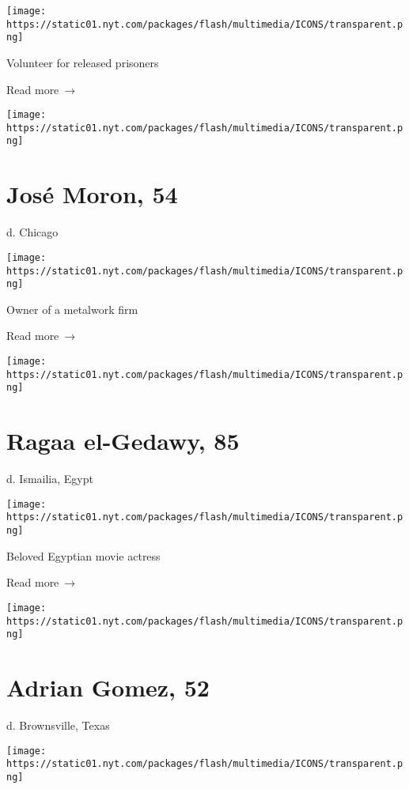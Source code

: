 \texttt{[image: https://static01.nyt.com/packages/flash/multimedia/ICONS/transparent.png]}

Volunteer for released prisoners

 Read more~→

\href{https://www.nytimes.com/2020/07/13/obituaries/jose-moron-dead-coronavirus.html}{}

\texttt{[image: https://static01.nyt.com/packages/flash/multimedia/ICONS/transparent.png]}

\hypertarget{josuxe9-moron-54}{%
\section{José Moron, 54}\label{josuxe9-moron-54}}

d. Chicago

\texttt{[image: https://static01.nyt.com/packages/flash/multimedia/ICONS/transparent.png]}

Owner of a metalwork firm

 Read more~→

\href{https://www.nytimes.com/2020/07/11/obituaries/ragaa-el-gedawy-dead-coronavirus.html}{}

\texttt{[image: https://static01.nyt.com/packages/flash/multimedia/ICONS/transparent.png]}

\hypertarget{ragaa-el-gedawy-85}{%
\section{Ragaa el-Gedawy, 85}\label{ragaa-el-gedawy-85}}

d. Ismailia, Egypt

\texttt{[image: https://static01.nyt.com/packages/flash/multimedia/ICONS/transparent.png]}

Beloved Egyptian movie actress

 Read more~→

\href{https://www.nytimes.com/2020/07/10/obituaries/adrian-gomez-dead-coronavirus.html}{}

\texttt{[image: https://static01.nyt.com/packages/flash/multimedia/ICONS/transparent.png]}

\hypertarget{adrian-gomez-52}{%
\section{Adrian Gomez, 52}\label{adrian-gomez-52}}

d. Brownsville, Texas

\texttt{[image: https://static01.nyt.com/packages/flash/multimedia/ICONS/transparent.png]}

